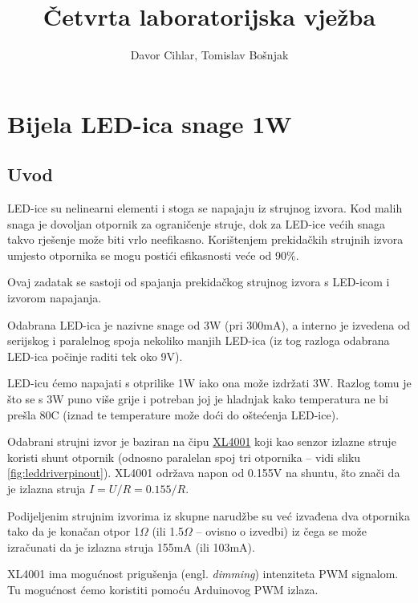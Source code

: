 \documentclass[times, utf8, zavrsni, numeric, sort]{fer}
\begin{document}
\title{Četvrta laboratorijska vježba}

\author{Davor Cihlar, Tomislav Bošnjak}

\maketitle

\tableofcontents

\chapter{Bijela LED-ica snage 1W}

\section{Uvod}
LED-ice su nelinearni elementi i stoga se napajaju iz strujnog izvora. Kod malih snaga je dovoljan otpornik za ograničenje struje, dok za LED-ice većih snaga takvo rješenje može biti vrlo neefikasno. Korištenjem prekidačkih strujnih izvora umjesto otpornika se mogu postići efikasnosti veće od 90\%.

Ovaj zadatak se sastoji od spajanja prekidačkog strujnog izvora s LED-icom i izvorom napajanja.

Odabrana LED-ica je nazivne snage od 3W (pri 300mA), a interno je izvedena od serijskog i paralelnog spoja nekoliko manjih LED-ica (iz tog razloga odabrana LED-ica počinje raditi tek oko 9V).

LED-icu ćemo napajati s otprilike 1W iako ona može izdržati 3W. Razlog tomu je što se s 3W puno više grije i potreban joj je hladnjak kako temperatura ne bi prešla 80{\textdegree}C (iznad te temperature može doći do oštećenja LED-ice).

Odabrani strujni izvor je baziran na čipu \href{http://www.xlsemi.com/datasheet/XL4001\%20datasheet.pdf}{XL4001} koji kao senzor izlazne struje koristi shunt otpornik (odnosno paralelan spoj tri otpornika -- vidi sliku \ref{fig:leddriverpinout}). XL4001 održava napon od 0.155V na shuntu, što znači da je izlazna struja $I=U/R=0.155/R$.

Podijeljenim strujnim izvorima iz skupne narudžbe su već izvađena dva otpornika tako da je konačan otpor 1$\Omega$ (ili 1.5$\Omega$ -- ovisno o izvedbi) iz čega se može izračunati da je izlazna struja 155mA (ili 103mA).

XL4001 ima mogućnost prigušenja (engl. \textit{dimming}) intenziteta PWM signalom. Tu mogućnost ćemo koristiti pomoću Arduinovog PWM izlaza.
\end{document}
